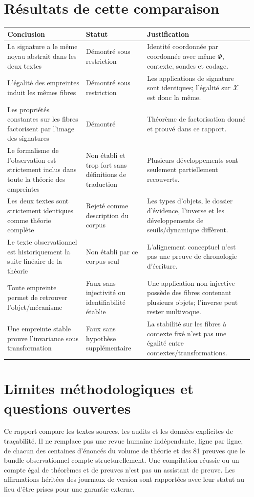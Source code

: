 \documentclass[11pt,a4paper,oneside]{report}
\newcommand{\X}{\mathcal X}
\begin{document}
\section{Résultats de cette comparaison}
\begin{longtable}{p{5.3cm}p{2.1cm}p{6.7cm}}
\toprule
\textbf{Conclusion} & \textbf{Statut} & \textbf{Justification}\\
\midrule\endhead
La signature a le même noyau abstrait dans les deux textes & Démontré sous restriction & Identité coordonnée par coordonnée avec même \(\Phi\), contexte, sondes et codage.\\
L'égalité des empreintes induit les mêmes fibres & Démontré sous restriction & Les applications de signature sont identiques; l'égalité sur \(\X\) est donc la même.\\
Les propriétés constantes sur les fibres factorisent par l'image des signatures & Démontré & Théorème de factorisation donné et prouvé dans ce rapport.\\
Le formalisme de l'observation est strictement inclus dans toute la théorie des empreintes & Non établi et trop fort sans définitions de traduction & Plusieurs développements sont seulement partiellement recouverts.\\
Les deux textes sont strictement identiques comme théorie complète & Rejeté comme description du corpus & Les types d'objets, le dossier d'évidence, l'inverse et les développements de seuils/dynamique diffèrent.\\
Le texte observationnel est historiquement la suite linéaire de la théorie & Non établi par ce corpus seul & L'alignement conceptuel n'est pas une preuve de chronologie d'écriture.\\
Toute empreinte permet de retrouver l'objet/mécanisme & Faux sans injectivité ou identifiabilité établie & Une application non injective possède des fibres contenant plusieurs objets; l'inverse peut rester multivoque.\\
Une empreinte stable prouve l'invariance sous transformation & Faux sans hypothèse supplémentaire & La stabilité sur les fibres à contexte fixé n'est pas une égalité entre contextes/transformations.\\
\bottomrule
\end{longtable}

\section{Limites méthodologiques et questions ouvertes}
Ce rapport compare les textes sources, les audits et les données explicites de traçabilité. Il ne remplace pas une revue humaine indépendante, ligne par ligne, de chacun des centaines d'énoncés du volume de théorie et des 81 preuves que le bundle observationnel compte structurellement. Une compilation réussie ou un compte égal de théorèmes et de preuves n'est pas un assistant de preuve. Les affirmations héritées des journaux de version sont rapportées avec leur statut au lieu d'être prises pour une garantie externe.
\end{document}
